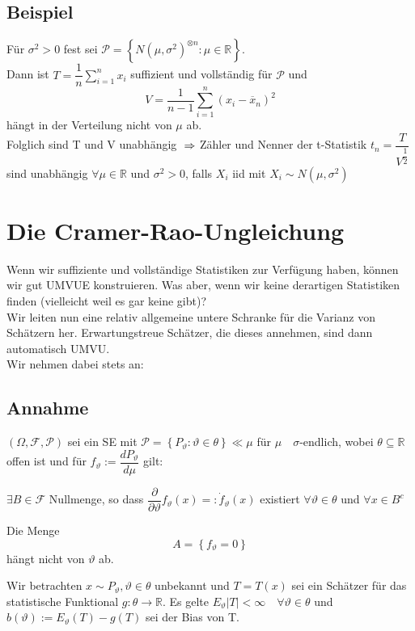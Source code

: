 \documentclass[german,10pt,oneside, fleqn, a4paper]{article}
\newcommand {\R}	{\mathbb{R}}
\newcommand{\Ra}	{\Rightarrow}
\newcommand{\ra}{\rightarrow}
\newcommand{\sm}[2][\infty]{\sum\limits_{#2}^{#1}}
\newcommand{\brc}[1]{\left(#1\right)}
\newcommand{\brac}[1]{\left\lbrace #1\right\rbrace}
\newcommand{\mc}[1]{\mathcal{#1}}
\newcommand{\1}[1]{1_{#1}}
\newcommand{\2}[1]{\1{\brac{#1}}}
\newcommand{\rraum}{\brc{\Omega,\mc{F},\mc{P}}}
\newcommand{\f}{\mc{F}}
\newcommand{\p}{\mc{P}}
\newcommand{\sumi}{\sm[n]{i=1}}
\newcommand{\qf}{\quad\forall}
\newcommand{\stuff}{{\otimes n}}
\begin{document}
\subsection{Beispiel}
\label{12.9}
Für $\sigma^2>0$ fest sei $\p=\brac{N(\mu,\sigma^2)^\stuff:\mu\in\R}$.\\
Dann ist $T=\dfrac{1}{n}\sumi x_i$ suffizient und vollständig für $\p$ und \[
V=\dfrac{1}{n-1}\sumi (x_i-\overline{x}_n)^2\]
hängt in der Verteilung nicht von $\mu$ ab.\\
Folglich sind T und V unabhängig
$\\\Ra$ Zähler und Nenner der t-Statistik $t_n=\dfrac{T}{V^{\dfrac{1}{2}}}$ sind unabhängig $\forall \mu\in\R$ und $\sigma^2>0$, falls $X_i$ iid mit $X_i\sim N(\mu,\sigma^2)$



\pagebreak
\section{Die Cramer-Rao-Ungleichung}
Wenn wir suffiziente und vollständige Statistiken zur Verfügung haben, können wir gut UMVUE konstruieren. Was aber, wenn wir keine derartigen Statistiken finden  (vielleicht weil es gar keine gibt)?\\
Wir leiten nun eine relativ allgemeine untere Schranke für die Varianz von Schätzern her. Erwartungstreue Schätzer, die dieses annehmen, sind dann automatisch UMVU.\\
Wir nehmen dabei stets an:

\subsection{Annahme}
\label{13.1}
$\rraum$ sei ein SE mit $\p=\brac{P_\vartheta:\vartheta\in\theta}\ll\mu$ für $\mu\quad \sigma$-endlich, wobei $\theta\subseteq\R$ offen ist und für $f_\vartheta:=\dfrac{dP_\vartheta}{d\mu}$ gilt:\begin{list}{•}{}
\item $\exists B\in\f$ Nullmenge, so dass $\dfrac{\partial}{\partial\vartheta}f_\vartheta(x)=:\dot f_\vartheta(x)$ existiert $\forall\vartheta\in\theta$ und $\forall x\in B^c$
\item Die Menge \[A=\brac{f_\vartheta=0}\]
hängt nicht von $\vartheta$ ab.
\end{list}
Wir betrachten $x\sim P_\vartheta, \vartheta\in\theta$ unbekannt und $T=T(x)$ sei ein Schätzer für das statistische Funktional $g:\theta\ra\R$. Es gelte $E_\vartheta|T|<\infty\qf\vartheta\in\theta$ und $b(\vartheta):=E_\vartheta(T)-g(T)$ sei der Bias von T.
\end{document}
